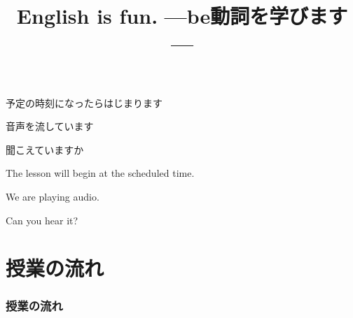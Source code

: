\documentclass[aspectratio=169]{beamer}
\title{English is fun.\,\,{}---be動詞を学びます---}
\author{}
\institute[]{}
\date[]
\begin{document}
\begin{frame}{}
\label{section}
\thispagestyle{empty}
\Large

\raggedright

予定の時刻になったらはじまります

\textbullet  音声を流しています

\textbullet  聞こえていますか　

\vfill

\raggedleft

The lesson will begin at the scheduled time.

\vspace{-6pt}

We are playing audio.

\vspace{-6pt}

Can you hear it?
\end{frame}

\begin{frame}
\label{section-1}
\thispagestyle{empty}
\titlepage
\end{frame}


\section*{授業の流れ}
\begin{frame}[plain]
  \frametitle{授業の流れ}
  \tableofcontents
\end{frame}
\end{document}
